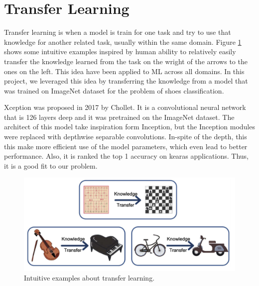 \section{Transfer Learning}

Transfer learning is when a model is train for one task and try to use that knowledge for another related task, usually within the same domain.  Figure \ref{fig:transfer} shows some intuitive examples inspired by human ability to relatively easily transfer the knowledge learned from the task on the wright of the arrows to the ones on the left. This idea have been applied to ML across all domains. In this project, we leveraged this idea by transferring the knowledge from a model that was trained on ImageNet dataset for the problem of shoes classification.

Xception \cite{chollet2017xception} was proposed in 2017 by Chollet. It is a convolutional neural network that is 126 layers deep and it was pretrained on the ImageNet dataset. The architect of this model take inspiration form Inception, but the Inception modules were replaced with depthwise separable convolutions. In-spite of the depth, this this make more efficient use of the model parameters, which even lead to better performance. Also, it is ranked the top 1 accuracy on kearas applications. Thus, it is a good fit to our problem. 

\begin{figure}[h]
  \centering
  \includegraphics[width=\linewidth]{figs/transfer_learning.png}
  \caption{Intuitive examples about transfer learning.}
  \label{fig:transfer}
\end{figure}